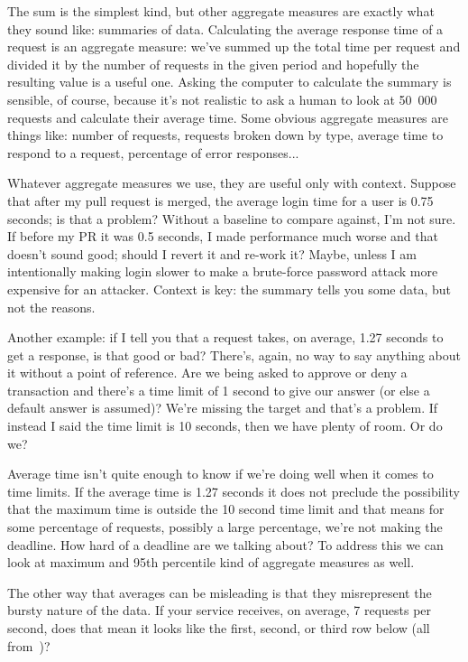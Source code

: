 The sum is the simplest kind, but other aggregate measures are exactly what they sound like: summaries of data. Calculating the average response time of a request is an aggregate measure: we've summed up the total time per request and divided it by the number of requests in the given period and hopefully the resulting value is a useful one. Asking the computer to calculate the summary is sensible, of course, because it's not realistic to ask a human to look at 50~000 requests and calculate their average time. Some obvious aggregate measures are things like: number of requests, requests broken down by type, average time to respond to a request, percentage of error responses...  

Whatever aggregate measures we use, they are useful only with context.  Suppose that after my pull request is merged, the average login time for a user is 0.75 seconds; is that a problem? Without a baseline to compare against, I'm not sure. If before my PR it was 0.5 seconds, I made performance much worse and that doesn't sound good; should I revert it and re-work it? Maybe, unless I am intentionally making login slower to make a brute-force password attack more expensive for an attacker. Context is key: the summary tells you some data, but not the reasons.

Another example: if I tell you that a request takes, on average, 1.27 seconds to get a response, is that good or bad? There's, again, no way to say anything about it without a point of reference. Are we being asked to approve or deny a transaction and there's a time limit of 1 second to give our answer (or else a default answer is assumed)? We're missing the target and that's a problem. If instead I said the time limit is 10 seconds, then we have plenty of room. Or do we?

Average time isn't quite enough to know if we're doing well when it comes to time limits. If the average time is 1.27 seconds it does not preclude the possibility that the maximum time is outside the 10 second time limit and that means for some percentage of requests, possibly a large percentage, we're not making the deadline. How hard of a deadline are we talking about? To address this we can look at maximum and 95th percentile kind of aggregate measures as well.

The other way that averages can be misleading is that they misrepresent the bursty nature of the data. If your service receives, on average, 7 requests per second, does that mean it looks like the first, second, or third row below (all from~\cite{usd})?

